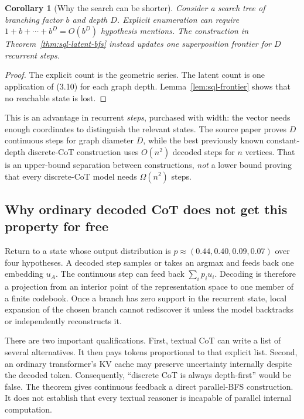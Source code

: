 \documentclass[11pt]{article}
\newtheorem{corollary}[theorem]{Corollary}
\theoremstyle{definition}
\begin{document}
\begin{corollary}[Why the search can be shorter]
Consider a search tree of branching factor $b$ and depth $D$. Explicit enumeration can require $1+b+\cdots+b^D=O(b^D)$ hypothesis mentions. The construction in Theorem~\ref{thm:sql-latent-bfs} instead updates one superposition frontier for $D$ recurrent steps.
\end{corollary}

\begin{proof}
The explicit count is the geometric series. The latent count is one application of (3.10) for each graph depth. Lemma~\ref{lem:sql-frontier} shows that no reachable state is lost.
\end{proof}

This is an advantage in recurrent \emph{steps}, purchased with width: the vector needs enough coordinates to distinguish the relevant states. The source paper proves $D$ continuous steps for graph diameter $D$, while the best previously known constant-depth discrete-CoT construction uses $O(n^2)$ decoded steps for $n$ vertices. That is an upper-bound separation between constructions, \emph{not} a lower bound proving that every discrete-CoT model needs $\Omega(n^2)$ steps.

\subsection{Why ordinary decoded CoT does not get this property for free}

Return to a state whose output distribution is $p\approx(0.44,0.40,0.09,0.07)$ over four hypotheses. A decoded step samples or takes an argmax and feeds back one embedding $u_A$. The continuous step can feed back $\sum_i p_i u_i$. Decoding is therefore a projection from an interior point of the representation space to one member of a finite codebook. Once a branch has zero support in the recurrent state, local expansion of the chosen branch cannot rediscover it unless the model backtracks or independently reconstructs it.

There are two important qualifications. First, textual CoT can write a list of several alternatives. It then pays tokens proportional to that explicit list. Second, an ordinary transformer's KV cache may preserve uncertainty internally despite the decoded token. Consequently, ``discrete CoT is always depth-first'' would be false. The theorem gives continuous feedback a direct parallel-BFS construction. It does not establish that every textual reasoner is incapable of parallel internal computation.
\end{document}
